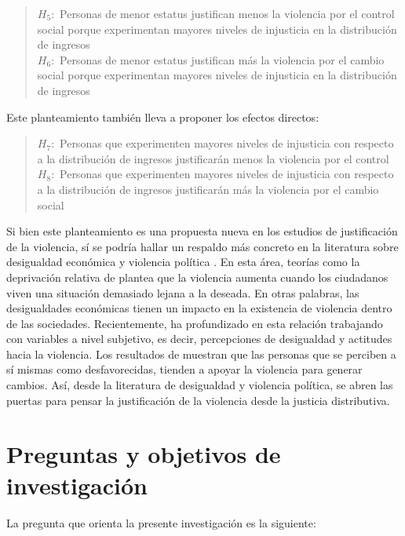 \documentclass[12pt,twoside]{templates/facsothesis}
\begin{document}
\begin{quote}
\(H_5:\) Personas de menor estatus justifican menos la violencia por el control social porque experimentan mayores niveles de injusticia en la distribución de ingresos\\
\(H_6:\) Personas de menor estatus justifican más la violencia por el cambio social porque experimentan mayores niveles de injusticia en la distribución de ingresos
\end{quote}

Este planteamiento también lleva a proponer los efectos directos:

\begin{quote}
\(H_7:\) Personas que experimenten mayores niveles de injusticia con respecto a la distribución de ingresos justificarán menos la violencia por el control\\
\(H_8:\) Personas que experimenten mayores niveles de injusticia con respecto a la distribución de ingresos justificarán más la violencia por el cambio social
\end{quote}

Si bien este planteamiento es una propuesta nueva en los estudios de justificación de la violencia, sí se podría hallar un respaldo más concreto en la literatura sobre desigualdad económica y violencia política \citep[ver][ para revisión]{Ostby2013}. En esta área, teorías como la deprivación relativa de \citet{Gurr1970} plantea que la violencia aumenta cuando los ciudadanos viven una situación demasiado lejana a la deseada. En otras palabras, las desigualdades económicas tienen un impacto en la existencia de violencia dentro de las sociedades. Recientemente, \citet{Rustad2016} ha profundizado en esta relación trabajando con variables a nivel subjetivo, es decir, percepciones de desigualdad y actitudes hacia la violencia. Los resultados de \citet{Rustad2016} muestran que las personas que se perciben a sí mismas como desfavorecidas, tienden a apoyar la violencia para generar cambios. Así, desde la literatura de desigualdad y violencia política, se abren las puertas para pensar la justificación de la violencia desde la justicia distributiva.

\hypertarget{preguntas-y-objetivos-de-investigaciuxf3n}{%
\chapter{Preguntas y objetivos de investigación}\label{preguntas-y-objetivos-de-investigaciuxf3n}}

La pregunta que orienta la presente investigación es la siguiente:
\end{document}
